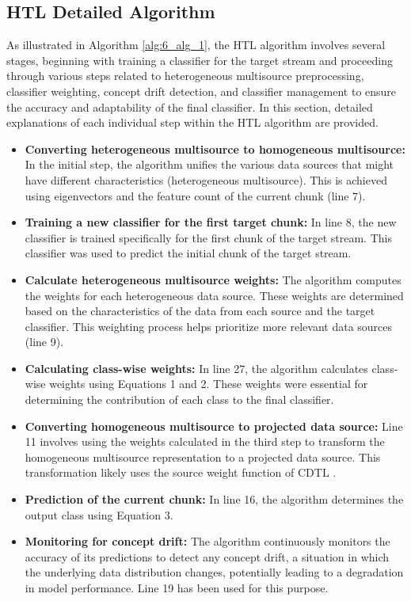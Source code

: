 \subsection{HTL Detailed Algorithm}

As illustrated in Algorithm \ref{alg:6_alg_1}, the HTL algorithm involves several stages, beginning with training a classifier for the target stream and proceeding through various steps related to heterogeneous multisource preprocessing, classifier weighting, concept drift detection, and classifier management to ensure the accuracy and adaptability of the final classifier. In this section, detailed explanations of each individual step within the HTL algorithm are provided.
\begin{itemize}
	\item \textbf{Converting heterogeneous multisource to homogeneous multisource:} In the initial step, the algorithm unifies the various data sources that might have different characteristics (heterogeneous multisource). This is achieved using eigenvectors and the feature count of the current chunk (line 7).
	\item \textbf{Training a new classifier for the first target chunk:} In line 8, the new classifier is trained specifically for the first chunk of the target stream. This classifier was used to predict the initial chunk of the target stream.
	\item \textbf{Calculate heterogeneous multisource weights:} The algorithm computes the weights for each heterogeneous data source. These weights are determined based on the characteristics of the data from each source and the target classifier. This weighting process helps prioritize more relevant data sources (line 9).
	\item \textbf{Calculating class-wise weights:} In line 27, the algorithm calculates class-wise weights using Equations 1 and 2. These weights were essential for determining the contribution of each class to the final classifier.
	\item \textbf{Converting homogeneous multisource to projected data source:} Line 11 involves using the weights calculated in the third step to transform the homogeneous multisource representation to a projected data source. This transformation likely uses the source weight function of CDTL \cite{yang2021concept}.
	\item \textbf{Prediction of the current chunk:} In line 16, the algorithm determines the output class using Equation 3.
	\item \textbf{Monitoring for concept drift:} The algorithm continuously monitors the accuracy of its predictions to detect any concept drift, a situation in which the underlying data distribution changes, potentially leading to a degradation in model performance. Line 19 has been used for this purpose.

\end{itemize}
